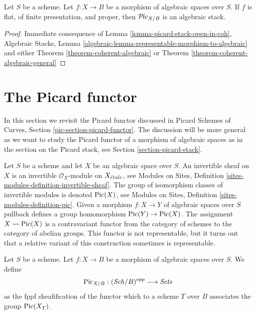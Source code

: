 \begin{proposition}
\label{proposition-pic}
Let $S$ be a scheme. Let $f : X \to B$ be a morphism of algebraic
spaces over $S$. If $f$ is flat, of finite presentation, and proper, then
$\mathcal{P}\!\mathit{ic}_{X/B}$ is an algebraic stack.
\end{proposition}

\begin{proof}
Immediate consequence of
Lemma \ref{lemma-picard-stack-open-in-coh},
Algebraic Stacks, Lemma
\ref{algebraic-lemma-representable-morphism-to-algebraic}
and either
Theorem \ref{theorem-coherent-algebraic}
or
Theorem \ref{theorem-coherent-algebraic-general}
\end{proof}








\section{The Picard functor}
\label{section-picard-functor}

\noindent
In this section we revisit the Picard functor discussed in
Picard Schemes of Curves, Section \ref{pic-section-picard-functor}.
The discussion will be more general as we want to study
the Picard functor of a morphism of algebraic spaces as in
the section on the Picard stack, see Section \ref{section-picard-stack}.

\medskip\noindent
Let $S$ be a scheme and let $X$ be an algebraic space over $S$.
An invertible sheaf on $X$ is an invertible $\mathcal{O}_X$-module
on $X_{\acute{e}tale}$, see
Modules on Sites, Definition \ref{sites-modules-definition-invertible-sheaf}.
The group of isomorphism classes of invertible modules is denoted
$\mathop{\mathrm{Pic}}\nolimits(X)$, see
Modules on Sites, Definition \ref{sites-modules-definition-pic}.
Given a morphism $f : X \to Y$ of algebraic spaces over $S$
pullback defines a group homomorphism $\mathop{\mathrm{Pic}}\nolimits(Y) \to \mathop{\mathrm{Pic}}\nolimits(X)$.
The assignment
$X \leadsto \mathop{\mathrm{Pic}}\nolimits(X)$ is a contravariant functor from the category
of schemes to the category of abelian groups. This functor is not
representable, but it turns out that a relative variant of this
construction sometimes is representable.

\begin{situation}
\label{situation-pic}
Let $S$ be a scheme.
Let $f : X \to B$ be a morphism of algebraic spaces over $S$.
We define
$$
\mathrm{Pic}_{X/B} : (\mathit{Sch}/B)^{opp} \longrightarrow \textit{Sets}
$$
as the fppf sheafification of the functor which to a scheme $T$
over $B$ associates the group $\mathop{\mathrm{Pic}}\nolimits(X_T)$.
\end{situation}

